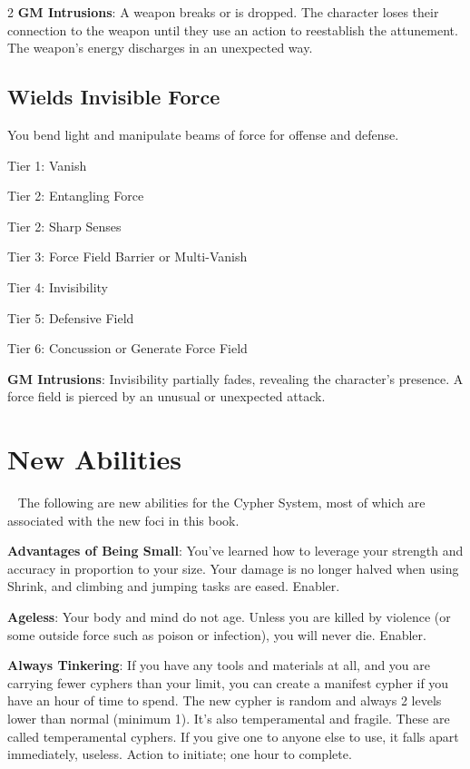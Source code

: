 \begin{multicols}{2}
\textbf{GM Intrusions}: A weapon breaks or is dropped. The character loses their connection to the weapon until they use an action to reestablish the attunement. The weapon’s energy discharges in an unexpected way.

\subsection{Wields Invisible Force} 

You bend light and manipulate beams of force for offense and defense.

Tier 1: Vanish 

Tier 2: Entangling Force 

Tier 2: Sharp Senses

Tier 3: Force Field Barrier or Multi-Vanish 

Tier 4: Invisibility 

Tier 5: Defensive Field

Tier 6: Concussion or Generate Force Field 

\textbf{GM Intrusions}: Invisibility partially fades, revealing the character’s presence. A force field is pierced by an unusual or unexpected attack.

\section{New Abilities}
 
The following are new abilities for the Cypher System, most of which are associated with the new foci in this book.

\textbf{Advantages of Being Small}: You’ve learned how to leverage your strength and accuracy in proportion to your size. Your damage is no longer halved when using Shrink, and climbing and jumping tasks are eased. Enabler.

\textbf{Ageless}: Your body and mind do not age. Unless you are killed by violence (or some outside force such as poison or infection), you will never die. Enabler.

\textbf{Always Tinkering}: If you have any tools and materials at all, and you are carrying fewer cyphers than your limit, you can create a manifest cypher if you have an hour of time to spend. The new cypher is random and always 2 levels lower than normal (minimum 1). It’s also temperamental and fragile. These are called temperamental cyphers. If you give one to anyone else to use, it falls apart immediately, useless. Action to initiate; one hour to complete.


\end{multicols}
